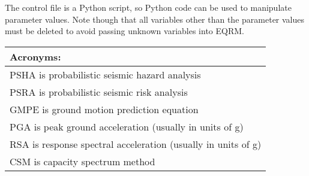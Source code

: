 The control file is a Python script, so Python code can be
used to manipulate parameter values.  Note though that all variables
other than the parameter values must be deleted to avoid passing
unknown variables into EQRM.

\vspace{2em}

\begin{tabular}{l}
\hline
\textbf{Acronyms}: \\
\hline
PSHA is probabilistic seismic hazard analysis \\
PSRA is probabilistic seismic risk analysis  \\
GMPE is ground motion prediction equation \\
PGA is peak ground acceleration (usually in units of g) \\
RSA is response spectral acceleration (usually in units of g) \\
CSM is capacity spectrum method \\
\hline
\end{tabular}

